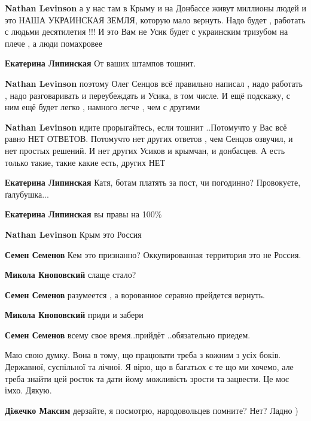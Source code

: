 \begin{itemize}
\begin{itemize}
\textbf{Nathan Levinson} а у нас там в Крыму и на Донбассе живут миллионы людей и это НАША УКРАИНСКАЯ ЗЕМЛЯ, которую мало вернуть. Надо будет , работать с людьми десятилетия !!! И это Вам не Усик будет с украинским тризубом на плече , а люди помахровее

\textbf{Екатерина Липинская} От ваших штампов тошнит.

\textbf{Nathan Levinson} поэтому Олег Сенцов всё правильно написал , надо работать , надо разговаривать и переубеждать и Усика, в том числе. И ещё подскажу, с ним ещё будет легко , намного легче , чем с другими

\textbf{Nathan Levinson} идите прорыгайтесь, если тошнит ..Потомучто у Вас всё равно НЕТ ОТВЕТОВ. Потомучто нет других ответов , чем Сенцов озвучил, и нет простых решений. И нет других Усиков и крымчан, и донбасцев. А есть только такие, такие какие есть, других НЕТ

\textbf{Екатерина Липинская} Катя, ботам платять за пост, чи погодинно? Провокуєте, ґалубушка...

\textbf{Екатерина Липинская} вы правы на 100\%

\textbf{Nathan Levinson} Крым это Россия

\textbf{Семен Семенов} Кем это признанно? Оккупированная территория это не Россия.

\textbf{Микола Кноповский} слаще стало?

\textbf{Семен Семенов} разумеется , а ворованное серавно прейдется вернуть.

\textbf{Микола Кноповский} приди и забери

\textbf{Семен Семенов} всему свое время..прийдёт ..обязательно приедем.
\end{itemize} %


Маю свою думку. Вона в тому, що працювати треба з кожним з усіх боків.
Державної, суспільної та лічної. Я вірю, що в багатьох є те що ми хочемо, але
треба знайти цей росток та дати йому можливість зрости та зацвести. Це моє
імхо. Дякую.

\begin{itemize} %

\textbf{Діжечко Максим} дерзайте, я посмотрю, народовольцев помните? Нет? Ладно )


\end{itemize}
\end{itemize}
